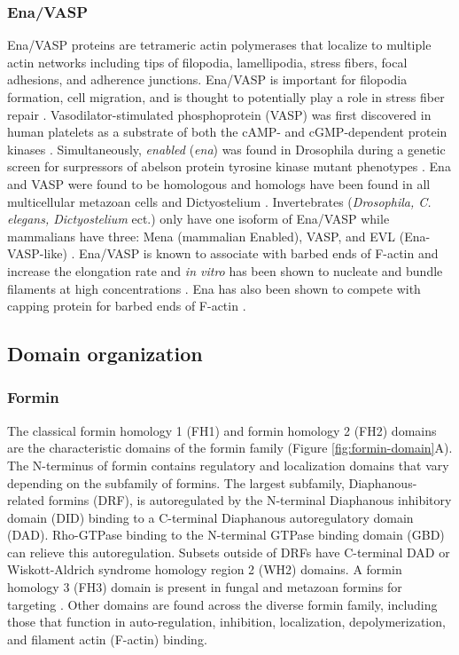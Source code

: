 \subsubsection{Ena/VASP}
	Ena/VASP proteins are tetrameric actin polymerases that localize to multiple actin networks including tips of filopodia, lamellipodia, stress fibers, focal adhesions, and adherence junctions. Ena/VASP is important for filopodia formation, cell migration, and is thought to potentially play a role in stress fiber repair \cite{kwiatkowski_function_2003}. Vasodilator-stimulated phosphoprotein (VASP) was first discovered in human platelets as a substrate of both the cAMP- and cGMP-dependent protein kinases \citep{halbrugge_analysis_1990}. Simultaneously, \textit{enabled} (\textit{ena}) was found in Drosophila during a genetic screen for surpressors of abelson protein tyrosine kinase mutant phenotypes \citep{gertler_genetic_1990}. Ena and VASP were found to be homologous \citep{ahern-djamali_identification_1999} and homologs have been found in all multicellular metazoan cells and Dictyostelium \citep{sebe-pedros_insights_2013}. Invertebrates (\textit{Drosophila, C. elegans, Dictyostelium} ect.) only have one isoform of Ena/VASP while mammalians have three: Mena (mammalian Enabled), VASP, and EVL (Ena-VASP-like) \cite{gertler_mena_1996}. Ena/VASP is known to associate with barbed ends of F-actin and increase the elongation rate and \textit{in vitro} has been shown to nucleate and bundle filaments at high concentrations \citep{breitsprecher_clustering_2008,breitsprecher_molecular_2011,winkelman_ena/vasp_2014,hansen_vasp_2010,pasic_ena/vasp_2008,bear_ena/vasp:_2009}.
Ena has also been shown to compete with capping protein for barbed ends of F-actin \citep{bear_ena/vasp:_2009}. 

\subsection{Domain organization}\label{ena-formin-domains}

\subsubsection{Formin}
The classical formin homology 1 (FH1) and formin homology 2 (FH2) domains are the characteristic  domains of the formin family (Figure \ref{fig:formin-domain}A). The N-terminus of formin contains regulatory and localization domains that vary depending on the subfamily of formins. The largest subfamily, Diaphanous-related formins (DRF), is autoregulated by the N-terminal Diaphanous inhibitory domain (DID) binding to a C-terminal Diaphanous autoregulatory domain (DAD).  Rho-GTPase binding to the N-terminal GTPase binding domain (GBD) can relieve this autoregulation. Subsets outside of DRFs have C-terminal DAD or Wiskott-Aldrich syndrome homology region 2 (WH2) domains. A formin homology 3 (FH3) domain is present in fungal and metazoan formins for targeting \citep{petersen_fh3_1998}. Other domains are found across the diverse formin family, including those that function in auto-regulation, inhibition, localization, depolymerization, and filament actin (F-actin) binding.

